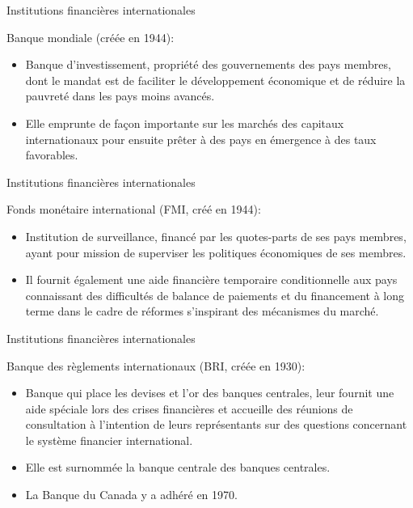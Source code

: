 \documentclass{beamer}
\begin{document}
\begin{frame}{Institutions financières internationales}
\begin{block}{Banque mondiale (créée en 1944):}
\begin{itemize}
\item Banque d’investissement, propriété des gouvernements des pays membres, dont le mandat est de faciliter le développement économique et de réduire la pauvreté dans les pays moins avancés. 
\item Elle emprunte de façon importante sur les marchés des capitaux internationaux pour ensuite prêter à des pays en émergence à des taux favorables.  
\end{itemize}
\end{block}
\end{frame}
\begin{frame}{Institutions financières internationales}
\begin{block}{Fonds monétaire international (FMI, créé en 1944):}
\begin{itemize}
\item Institution de surveillance, financé par les quotes-parts de ses pays membres, ayant pour mission de superviser les politiques économiques de ses membres.
\item Il fournit également une aide financière temporaire conditionnelle aux pays connaissant des difficultés de balance de paiements et du financement à long terme dans le cadre de réformes s’inspirant des mécanismes du marché.  
\end{itemize}
\end{block}
\end{frame}
\begin{frame}{Institutions financières internationales}
\begin{block}{Banque des règlements internationaux (BRI, créée en 1930):}
\begin{itemize}
\item Banque qui place les devises et l’or des banques centrales, leur fournit une aide spéciale lors des crises financières et accueille des réunions de consultation à l’intention de leurs représentants sur des questions concernant le système financier international.
\item Elle est surnommée la banque centrale des banques centrales.
\item La Banque du Canada y a adhéré en 1970. 
\end{itemize}
\end{block}
\end{frame}
\end{document}
